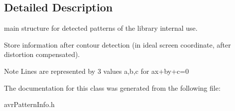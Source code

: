 \subsection{Detailed Description}
main structure for detected patterns of the library internal use. 

Store information after contour detection (in ideal screen coordinate, after distortion compensated). \begin{DoxyNote}{Note}
Lines are represented by 3 values a,b,c for ax+by+c=0 
\end{DoxyNote}


The documentation for this class was generated from the following file\-:\begin{DoxyCompactItemize}
\item 
avr\-Pattern\-Info.\-h\end{DoxyCompactItemize}
